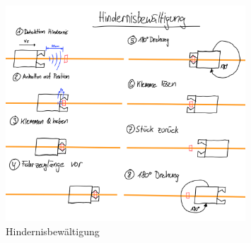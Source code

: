 \documentclass[../main.tex]{subfiles}
\begin{document}
\begin{figure}[H]
\centering
\includegraphics[width=0.8\textwidth]{img/lösungskonzpet/Skizzen/Skizze_Hindernisbewältigung.png}
\caption{Hindernisbewältigung}
\label{img:Skizze_Hindernisbewältigung}
\end{figure}
\end{document}
